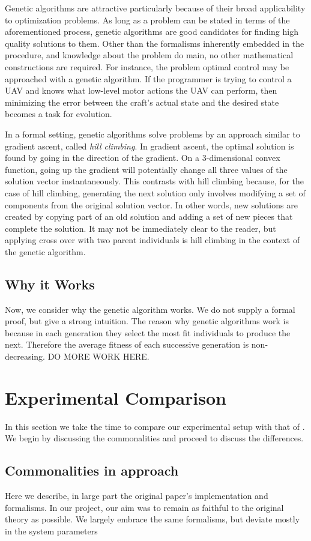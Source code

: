 \documentclass[conference]{IEEEtran}
\begin{document}
Genetic algorithms are attractive particularly because of their broad applicability to optimization problems. As long as a problem can be stated in terms of the aforementioned process, genetic algorithms are good candidates for finding high quality solutions to them. Other than the formalisms inherently embedded in the procedure, and knowledge about the problem do main, no other mathematical constructions are required. For instance, the problem optimal control may be approached with a genetic algorithm. If the programmer is trying to control a UAV and knows what low-level motor actions the UAV can perform, then minimizing the error between the craft's actual state and the desired state becomes a task for evolution. 

In a formal setting, genetic algorithms solve problems by an approach similar to gradient ascent, called {\it hill climbing}. In gradient ascent, the optimal solution is found by going in the direction of the gradient. On a 3-dimensional convex function, going up the gradient will potentially change all three values of the solution vector instantaneously. This contrasts with hill climbing because, for the case of hill climbing, generating the next solution only involves modifying a set of components from the original solution vector. In other words, new solutions are created by copying part of an old solution and adding a set of new pieces that complete the solution. It may not be immediately clear to the reader, but applying cross over with two parent individuals is hill climbing in the context of the genetic algorithm.

\subsection{Why it Works}
Now, we consider why the genetic algorithm works. We do not supply a formal proof, but give a strong intuition. The reason why genetic algorithms work is because in each generation they select the most fit individuals to produce the next. Therefore the average fitness of each successive generation is non-decreasing. DO MORE WORK HERE.
\section{Experimental Comparison}
In this section we take the time to compare our experimental setup with that of \cite{lillywhite2013feature}. We begin by discussing the commonalities and proceed to discuss the differences.
\subsection{Commonalities in approach}
Here we describe, in large part the original paper's implementation and formalisms. In our project, our aim was to remain as faithful to the original theory as possible. We largely embrace the same formalisms, but deviate mostly in the system parameters
\end{document}
